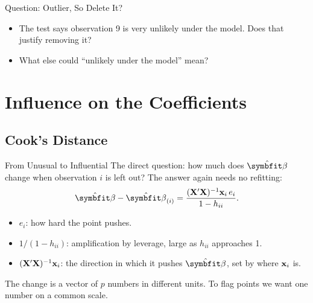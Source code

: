 \begin{frame}{Question: Outlier, So Delete It?}
    \begin{itemize}
        \item The test says observation 9 is very unlikely under the model. Does that justify removing it?
        \item What else could ``unlikely under the model'' mean?
    \end{itemize}
\end{frame}


\section{Influence on the Coefficients}


\subsection{Cook's Distance}


\begin{frame}{From Unusual to Influential}
    The direct question: how much does $\hat{\bbeta}$ change when observation $i$ is left out? The answer again needs no refitting:
    \[
    \hat{\bbeta}-\hat{\bbeta}_{(i)}=\frac{(\bX'\bX)^{-1}\bx_i\,e_i}{1-h_{ii}} .
    \]
    \begin{itemize}
        \item $e_i$: how hard the point pushes.
        \item $1/(1-h_{ii})$: amplification by leverage, large as $h_{ii}$ approaches 1.
        \item $(\mathbf{X}'\mathbf{X})^{-1}\mathbf{x}_i$: the direction in which it pushes $\hat{\bbeta}$, set by where $\mathbf{x}_i$ is.
    \end{itemize}
    The change is a vector of $p$ numbers in different units. To flag points we want one number on a common scale.
\end{frame}


